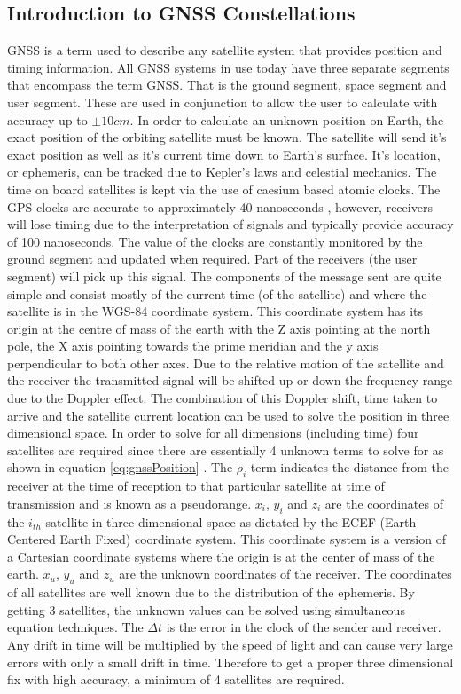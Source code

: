 \subsection{Introduction to GNSS Constellations}\label{subsec:GNSS_Intro}
GNSS is a term used to describe any satellite system that provides position and timing information. All GNSS systems in use today have three separate segments that
encompass the term GNSS. That is the ground segment, space segment and user segment. These are used in conjunction to allow the user to calculate with accuracy up to $\pm
10cm$. In order to calculate an unknown position on Earth, the exact position of the orbiting satellite must be known. The satellite will send it's exact position as well
as it's current time down to Earth's surface. It's location, or ephemeris, can be tracked due to Kepler's laws and celestial mechanics. The time on board satellites is
kept via the use of caesium based atomic clocks. The GPS clocks are accurate to approximately 40 nanoseconds \cite{RN72} \cite{RN62}, however, receivers will lose timing due to
the interpretation of signals and typically provide accuracy of 100 nanoseconds. The value of the clocks are constantly monitored by the ground segment and updated when
required. Part of the receivers (the user segment) will pick up this signal. The components of the message sent are quite simple and consist mostly of the current time
(of the satellite) and where the satellite is in the WGS-84 coordinate system\cite{RN46}. This coordinate system has its origin at the centre of mass of the earth with
the Z axis pointing at the north pole, the X axis pointing towards the prime meridian and the y axis perpendicular to both other axes. Due to the relative motion of the
satellite and the receiver the transmitted signal will be shifted up or down the frequency range due to the Doppler effect. The combination of this Doppler shift, time
taken to arrive and the satellite current location can be used to solve the position in three dimensional space. In order to solve for all dimensions (including time)
four satellites are required since there are essentially 4 unknown terms to solve for as shown in equation \ref{eq:gnssPosition} \cite{RN46}. The $\rho_i$ term indicates
the distance from the receiver at the time of reception to that particular satellite at time of transmission  and is known as a pseudorange. $x_i$, $y_i$ and $z_i$ are
the coordinates of the $i_{th}$ satellite in three dimensional space as dictated by the ECEF (Earth Centered Earth Fixed) coordinate system. This coordinate system is a
version of a Cartesian coordinate systems where the origin is at the center of mass of the earth. $x_u$, $y_u$ and $z_u$ are the unknown coordinates of the receiver. The
coordinates of all satellites are well known due to the distribution of the ephemeris. By getting 3 satellites, the unknown values can be solved using simultaneous
equation techniques. The $\Delta t$ is the error in the clock of the sender and receiver. Any drift in time will be multiplied by the speed of light and can cause very
large errors with only a small drift in time. Therefore to get a proper three dimensional fix with high accuracy, a minimum of 4 satellites are required.  

